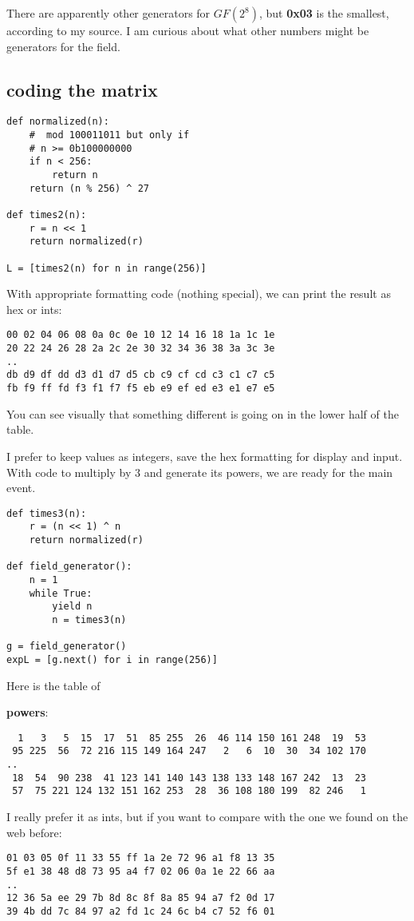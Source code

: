 \documentclass[11pt, oneside]{article}
\begin{document}
There are apparently other generators for $GF(2^8)$, but \textbf{0x03} is the smallest, according to my source.  I am curious about what other numbers might be generators for the field.

\subsection*{coding the matrix}

\begin{verbatim}
def normalized(n):
    #  mod 100011011 but only if
    # n >= 0b100000000
    if n < 256:
        return n
    return (n % 256) ^ 27

def times2(n):
    r = n << 1
    return normalized(r)

L = [times2(n) for n in range(256)]
\end{verbatim}
With appropriate formatting code (nothing special), we can print the result as hex or ints:
\begin{verbatim}
00 02 04 06 08 0a 0c 0e 10 12 14 16 18 1a 1c 1e
20 22 24 26 28 2a 2c 2e 30 32 34 36 38 3a 3c 3e
..
db d9 df dd d3 d1 d7 d5 cb c9 cf cd c3 c1 c7 c5
fb f9 ff fd f3 f1 f7 f5 eb e9 ef ed e3 e1 e7 e5 
\end{verbatim}
You can see visually that something different is going on in the lower half of the table.  

I prefer to keep values as integers, save the hex formatting for display and input.  With code to multiply by $3$ and generate its powers, we are ready for the main event.
\begin{verbatim}
def times3(n):
    r = (n << 1) ^ n
    return normalized(r) 

def field_generator():
    n = 1
    while True:
        yield n
        n = times3(n)

g = field_generator()
expL = [g.next() for i in range(256)]
\end{verbatim}

Here is the table of

\textbf{powers}:
\begin{verbatim}
  1   3   5  15  17  51  85 255  26  46 114 150 161 248  19  53
 95 225  56  72 216 115 149 164 247   2   6  10  30  34 102 170
..
 18  54  90 238  41 123 141 140 143 138 133 148 167 242  13  23
 57  75 221 124 132 151 162 253  28  36 108 180 199  82 246   1
\end{verbatim}

I really prefer it as ints, but if you want to compare with the one we found on the web before:
\begin{verbatim}
01 03 05 0f 11 33 55 ff 1a 2e 72 96 a1 f8 13 35
5f e1 38 48 d8 73 95 a4 f7 02 06 0a 1e 22 66 aa
..
12 36 5a ee 29 7b 8d 8c 8f 8a 85 94 a7 f2 0d 17
39 4b dd 7c 84 97 a2 fd 1c 24 6c b4 c7 52 f6 01
\end{verbatim}
\end{document}

